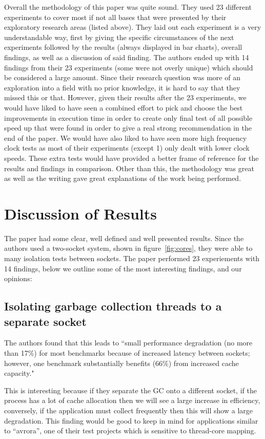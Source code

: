 \documentclass[conference]{IEEEtran}
\begin{document}
Overall the methodology of this paper was quite sound. They used 23 different experiments to
cover most if not all bases that were presented by their exploratory research areas (listed above).
They laid out each experiment is a very understandable way, first by giving the specific circumstances
of the next experiments followed by the results (always displayed in bar charts), overall findings, as
well as a discussion of said finding. The authors ended up with 14 findings from their 23 experiments
(some were not overly unique) which should be considered a large amount. Since their research question
was more of an exploration into a field with no prior knowledge, it is hard to say that they missed
this or that. However, given their results after the 23 experiments, we would have liked to have seen
a combined effort to pick and choose the best improvements in execution time in order to create
only final test of all possible speed up that were found in order to give a real strong recommendation
in the end of the paper. We would have also liked to have seen more high frequency clock tests as most
of their experiments (except 1) only dealt with lower clock speeds. These extra tests would have 
provided a better frame of reference for the results and findings in comparison.
Other than this, the methodology was great as well as the writing gave great
explanations of the work being performed.


\section{Discussion of Results}
The paper had some clear, well defined and well presented results.  Since the authors used a two-socket system, shown in figure~\ref{fig:cores}, they were able to many isolation tests between sockets.  The paper performed 23 experiements with 14 findings, below we outline some of the most interesting findings, and our opinions:

\subsection{Isolating garbage collection threads to a separate socket}
 
The authors found that this leads to ``small performance degradation (no more than 17\%) for most benchmarks because of increased latency between sockets; however, one benchmark substantially benefits (66\%) from increased cache capacity."

This is interesting because if they separate the GC onto a different socket, if the process has a lot of cache allocation then we will see a large increase in efficiency, conversely, if the application must collect frequently then this will show a large degradation.  This finding would be good to keep in mind for applications similar to ``avrora'', one of their test projects which is sensitive to thread-core mapping.
\end{document}
